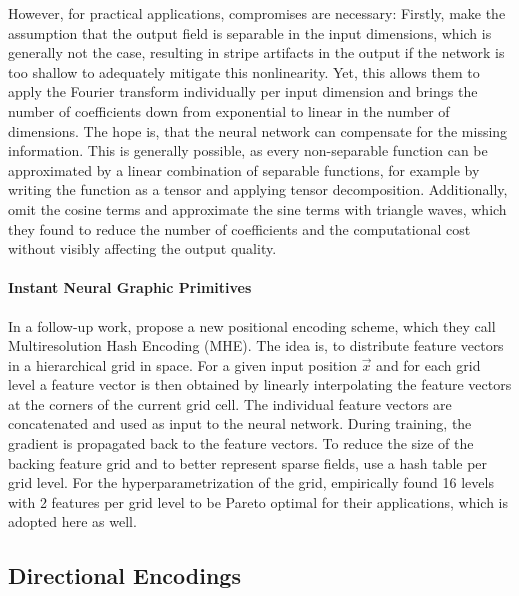 However, for practical applications, compromises are necessary:
Firstly, \textcite{tancik2020} make the assumption that the output field is separable in the input dimensions, which is generally not the case, resulting in stripe artifacts in the output if the network is too shallow to adequately mitigate this nonlinearity.
Yet, this allows them to apply the Fourier transform individually per input dimension and brings the number of coefficients down from exponential to linear in the number of dimensions.
The hope is, that the neural network can compensate for the missing information.
This is generally possible, as every non-separable function can be approximated by a linear combination of separable functions, for example by writing the function as a tensor and applying tensor decomposition.
Additionally, \textcite{muller2021} omit the cosine terms and approximate the sine terms with triangle waves, which they found to reduce the number of coefficients and the computational cost without visibly affecting the output quality.

\paragraph{Instant Neural Graphic Primitives}
In a follow-up work, \textcite{muller2022} propose a new positional encoding scheme, which they call Multiresolution Hash Encoding (MHE).
The idea is, to distribute feature vectors in a hierarchical grid in space.
For a given input position $\vec{x}$ and for each grid level a feature vector is then obtained by linearly interpolating the feature vectors at the corners of the current grid cell.
The individual feature vectors are concatenated and used as input to the neural network.
During training, the gradient is propagated back to the feature vectors.
To reduce the size of the backing feature grid and to better represent sparse fields, \textcite{muller2022} use a hash table per grid level.
For the hyperparametrization of the grid, \textcite{muller2022} empirically found 16 levels with 2 features per grid level to be Pareto optimal for their applications, which is adopted here as well.

\subsection{Directional Encodings}

